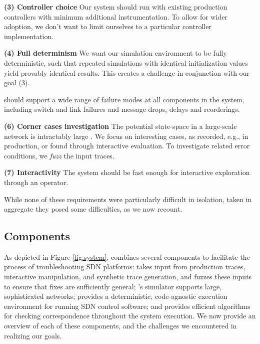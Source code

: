 {\noindent \textbf{(3) Controller choice} Our system should run with existing production
controllers with minimum additional instrumentation. To allow for wider adoption, we don't want to limit ourselves to
a particular controller implementation.

\noindent \textbf{(4) Full determinism} We want our simulation environment to be fully
deterministic, such that repeated simulations with identical initialization values
yield provably identical results. This creates a challenge in conjunction with our goal (3).

 \projectname{} should
support a wide range of failure modes at all components in the
system, including switch and link failures and message drops, delays and reorderings.

\noindent\textbf{(6) Corner cases investigation} The potential state-space in a large-scale network
is intractably large .  We focus on interesting cases, as recorded, e.g., in production, or
found through interactive evaluation. To investigate related error conditions,
we \emph{fuzz} the input traces.

\noindent\textbf{(7) Interactivity} The system should be fast enough for interactive exploration through
an operator.

\medskip

While none of these requirements were particularly difficult in isolation, taken in aggregate they posed some difficulties, as we now recount.

\subsection{Components}

As depicted in Figure \ref{fig:system}, \projectname{} combines several
components to facilitate the process of troubleshooting SDN platforms:
\projectname{} takes input
from production traces, interactive manipulation, and synthetic trace
generation, and fuzzes these inputs to ensure that fixes are sufficiently general;
\projectname{}'s simulator supports large, sophisticated networks;
\projectname{} provides a deterministic, code-agnostic execution environment
for running SDN control software; and provides efficient algorithms for
checking correspondence throughout the system execution. We now provide an
overview of each of these components, and the challenges we encountered in
realizing our goals.

}
